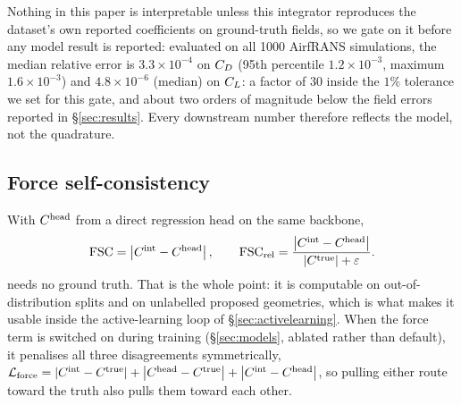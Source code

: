 Nothing in this paper is interpretable unless this integrator reproduces the
dataset's own reported coefficients on ground-truth fields, so we gate on it
before any model result is reported: evaluated on all 1000 AirfRANS simulations,
the median relative error is $3.3\times10^{-4}$ on $C_D$
(95th percentile $1.2\times10^{-3}$, maximum $1.6\times10^{-3}$) and
$4.8\times10^{-6}$ (median) on $C_L$: a factor of 30 inside the $1\%$
tolerance we set for this gate, and about two orders
of magnitude below the field errors reported in \S\ref{sec:results}. Every
downstream \FSC{} number therefore reflects the model, not the quadrature.

\subsection{Force self-consistency}
With $C^{\text{head}}$ from a direct regression head on the same backbone,
\begin{equation}
  \mathrm{FSC} = \left\lvert C^{\text{int}} - C^{\text{head}} \right\rvert, \qquad
  \mathrm{FSC}_{\text{rel}} = \frac{\left\lvert C^{\text{int}} - C^{\text{head}} \right\rvert}{\left\lvert C^{\text{true}} \right\rvert + \varepsilon}.
\end{equation}
\FSC{} needs no ground truth. That is the whole point: it is computable on
out-of-distribution splits and on unlabelled proposed geometries, which is what
makes it usable inside the active-learning loop of \S\ref{sec:activelearning}.
When the force term is switched on during training (\S\ref{sec:models}, ablated
rather than default), it penalises all three disagreements symmetrically,
$\mathcal{L}_{\text{force}} = \left\lvert C^{\text{int}} - C^{\text{true}} \right\rvert + \left\lvert C^{\text{head}} - C^{\text{true}} \right\rvert + \left\lvert C^{\text{int}} - C^{\text{head}} \right\rvert$,
so pulling either route toward the truth also pulls them toward each other.

